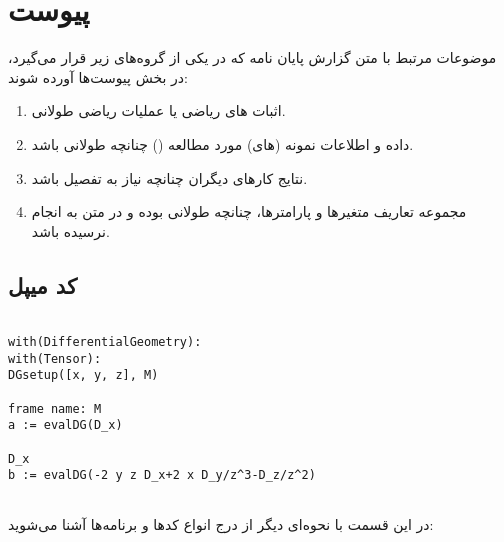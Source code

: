 \chapter*{‌پیوست}

موضوعات مرتبط با متن گزارش پایان نامه كه در يكی از گروه‌های زير قرار می‌گيرد، در بخش پيوست‌ها آورده شوند:
\begin{enumerate}
\item  اثبات های رياضی يا عمليات رياضی طولانی‌.‌
\item داده و اطلاعات نمونه (های) مورد مطالعه () چنانچه طولانی باشد‌.‌
\item نتايج كارهای ديگران چنانچه نياز به تفصيل باشد‌.‌
\item مجموعه تعاريف متغيرها و پارامترها، چنانچه طولانی بوده و در متن به انجام نرسيده باشد‌.‌
\end{enumerate}
\section*{کد میپل }
\begin{latin}
\begin{verbatim}

with(DifferentialGeometry):
with(Tensor):
DGsetup([x, y, z], M)
																	frame name: M
a := evalDG(D_x)
																	D_x
b := evalDG(-2 y z D_x+2 x D_y/z^3-D_z/z^2)


\end{verbatim}
\end{latin}

در این قسمت با نحوه‌ای دیگر از درج انواع کدها و برنامه‌ها آشنا می‌شوید:
\lr{}
\lr{}
\lr{}
\lr{}
